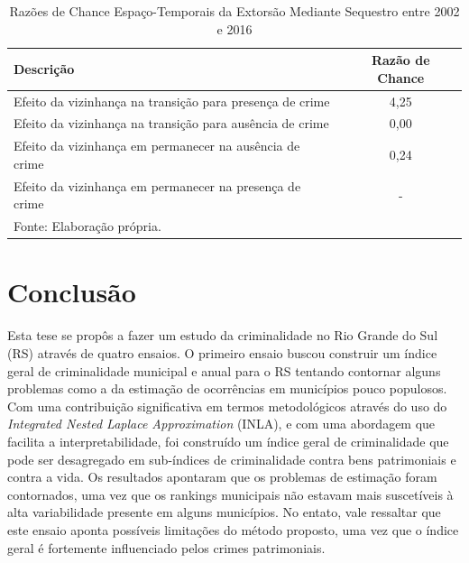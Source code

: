 \documentclass[12pt,openright,oneside,a4paper,english,french,spanish]{abntex2}
\numberwithin{table}{section} %
\numberwithin{figure}{section} %
\begin{document}
\begin{subappendices}
\begin{table}[H]
\centering
\caption{Razões de Chance Espaço-Temporais da Extorsão Mediante Sequestro entre 2002 e 2016}
        \begin{tabular}{lc}
            \hline
            {\textbf{Descrição}} & {\textbf{Razão de Chance}} \\\hline
            {Efeito da vizinhança na transição para presença de crime} & {4,25} \\
            {Efeito da vizinhança na transição para ausência de crime} & {0,00} \\
            {Efeito da vizinhança em permanecer na ausência de crime} & {0,24} \\
            {Efeito da vizinhança em permanecer na presença de crime} & {-} \\\hline
            \tiny Fonte: Elaboração própria.
        \end{tabular}
    \label{tab:odds_espaco_tempo_extoMS_2002_2016}
\end{table}









\end{subappendices}





\chapter{Conclusão}

Esta tese se propôs a fazer um estudo da criminalidade no Rio Grande do Sul (RS) através de quatro ensaios. O primeiro ensaio buscou construir um índice geral de criminalidade municipal e anual para o RS tentando contornar alguns problemas como a da estimação de ocorrências em municípios pouco populosos. Com uma contribuição significativa em termos metodológicos através do uso do \textit{Integrated Nested Laplace Approximation} (INLA), e com uma abordagem que facilita a interpretabilidade, foi construído um índice geral de criminalidade que pode ser desagregado em sub-índices de criminalidade contra bens patrimoniais e contra a vida. Os resultados apontaram que os problemas de estimação foram contornados, uma vez que os rankings municipais não estavam mais suscetíveis à alta variabilidade presente em alguns municípios. No entato, vale ressaltar que este ensaio aponta possíveis limitações do método proposto, uma vez que o índice geral é fortemente influenciado pelos crimes patrimoniais.
\end{document}
